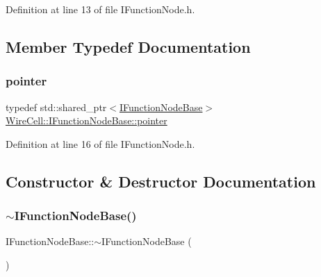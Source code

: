 Definition at line 13 of file I\+Function\+Node.\+h.



\subsection{Member Typedef Documentation}
\mbox{\label{class_wire_cell_1_1_i_function_node_base_a8c48cb6d791f15206f0d00fed70e05f3}} 
\subsubsection{\texorpdfstring{pointer}{pointer}}
{\footnotesize\ttfamily typedef std\+::shared\+\_\+ptr$<$\hyperlink{class_wire_cell_1_1_i_function_node_base}{I\+Function\+Node\+Base}$>$ \hyperlink{class_wire_cell_1_1_i_function_node_base_a8c48cb6d791f15206f0d00fed70e05f3}{Wire\+Cell\+::\+I\+Function\+Node\+Base\+::pointer}}



Definition at line 16 of file I\+Function\+Node.\+h.



\subsection{Constructor \& Destructor Documentation}
\mbox{\label{class_wire_cell_1_1_i_function_node_base_aca515a5de2dabccf0e02f967fd2fb0ca}} 
\subsubsection{\texorpdfstring{$\sim$\+I\+Function\+Node\+Base()}{~IFunctionNodeBase()}}
{\footnotesize\ttfamily I\+Function\+Node\+Base\+::$\sim$\+I\+Function\+Node\+Base (\begin{DoxyParamCaption}{ }\end{DoxyParamCaption})\hspace{0.3cm}{\ttfamily [virtual]}}




